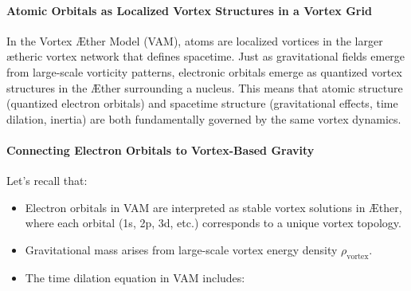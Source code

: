 \paragraph{Atomic Orbitals as Localized Vortex Structures in a Vortex Grid}
In the Vortex Æther Model (VAM), atoms are localized vortices in the larger ætheric vortex network that defines spacetime.
Just as gravitational fields emerge from large-scale vorticity patterns, electronic orbitals emerge as quantized vortex structures in the Æther surrounding a nucleus.
This means that atomic structure (quantized electron orbitals) and spacetime structure (gravitational effects, time dilation, inertia) are both fundamentally governed by the same vortex dynamics.

\paragraph{Connecting Electron Orbitals to Vortex-Based Gravity}
Let’s recall that:
\begin{itemize}
    \item Electron orbitals in VAM are interpreted as stable vortex solutions in Æther, where each orbital (1s, 2p, 3d, etc.) corresponds to a unique vortex topology.
    \item Gravitational mass arises from large-scale vortex energy density $\rho_\text{vortex}$.
    \item The time dilation equation in VAM includes:
\end{itemize}

